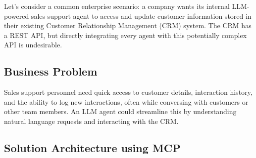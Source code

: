 Let's consider a common enterprise scenario: a company wants its internal LLM-powered sales support agent to access and update customer 
information stored in their existing Customer Relationship Management (CRM) system. The CRM has a REST API, but directly integrating 
every agent with this potentially complex API is undesirable.

\subsection*{Business Problem}
Sales support personnel need quick access to customer details, interaction history, and the ability to log new interactions, 
often while conversing with customers or other team members. An LLM agent could streamline this by understanding natural language 
requests and interacting with the CRM.

\subsection*{Solution Architecture using MCP}

